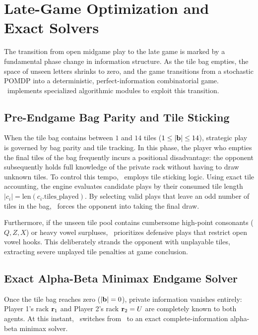 \section{Late-Game Optimization and Exact Solvers}
\label{sec:late_game}

The transition from open midgame play to the late game is marked by a fundamental phase change in information structure. As the tile bag empties, the space of unseen letters shrinks to zero, and the game transitions from a stochastic POMDP into a deterministic, perfect-information combinatorial game. \algo\ implements specialized algorithmic modules to exploit this transition.

\subsection{Pre-Endgame Bag Parity and Tile Sticking}

When the tile bag contains between $1$ and $14$ tiles ($1 \le |\mathbf{b}| \le 14$), strategic play is governed by bag parity and tile tracking. In this phase, the player who empties the final tiles of the bag frequently incurs a positional disadvantage: the opponent subsequently holds full knowledge of the private rack without having to draw unknown tiles. To control this tempo, \algo\ employs tile sticking logic. Using exact tile accounting, the engine evaluates candidate plays by their consumed tile length $|c_i| = \mathrm{len}(c_i.\mathrm{tiles\_played})$. By selecting valid plays that leave an odd number of tiles in the bag, \algo\ forces the opponent into taking the final draw.

Furthermore, if the unseen tile pool contains cumbersome high-point consonants ($Q, Z, X$) or heavy vowel surpluses, \algo\ prioritizes defensive plays that restrict open vowel hooks. This deliberately strands the opponent with unplayable tiles, extracting severe unplayed tile penalties at game conclusion.

\subsection{Exact Alpha-Beta Minimax Endgame Solver}

Once the tile bag reaches zero ($|\mathbf{b}| = 0$), private information vanishes entirely: Player 1's rack $\mathbf{r}_1$ and Player 2's rack $\mathbf{r}_2 = U$ are completely known to both agents. At this instant, \algo\ switches from \bams\ to an exact complete-information alpha-beta minimax solver.

